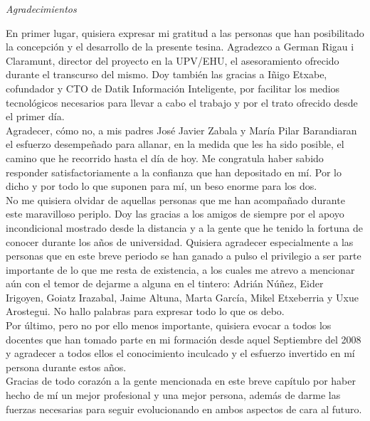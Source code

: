 \begin{flushright}
	\Large\textit{Agradecimientos}
\end{flushright}

En primer lugar, quisiera expresar mi gratitud a las personas que han posibilitado la concepción y el desarrollo de la presente tesina. Agradezco a German Rigau i Claramunt, director del proyecto en la UPV/EHU, el asesoramiento ofrecido durante el transcurso del mismo. Doy también las gracias a Iñigo Etxabe, cofundador y CTO de Datik Información Inteligente, por facilitar los medios tecnológicos necesarios para llevar a cabo el trabajo y por el trato ofrecido desde el primer día.\\

Agradecer, cómo no, a mis padres José Javier Zabala y María Pilar Barandiaran el esfuerzo desempeñado para allanar, en la medida que les ha sido posible, el camino que he recorrido hasta el día de hoy. Me congratula haber sabido responder satisfactoriamente a la confianza que han depositado en mí. Por lo dicho y por todo lo que suponen para mí, un beso enorme para los dos.\\

No me quisiera olvidar de aquellas personas que me han acompañado durante este maravilloso periplo. Doy las gracias a los amigos de siempre por el apoyo incondicional mostrado desde la distancia y a la gente que he tenido la fortuna de conocer durante los años de universidad. Quisiera agradecer especialmente a las personas que en este breve periodo se han ganado a pulso el privilegio a ser parte importante de lo que me resta de existencia, a los cuales me atrevo a mencionar aún con el temor de dejarme a alguna en el tintero: Adrián Núñez, Eider Irigoyen, Goiatz Irazabal, Jaime Altuna, Marta García, Mikel Etxeberria y Uxue Arostegui. No hallo palabras para expresar todo lo que os debo.\\

Por último, pero no por ello menos importante, quisiera evocar a todos los docentes que han tomado parte en mi formación desde aquel Septiembre del 2008 y agradecer a todos ellos el conocimiento inculcado y el esfuerzo invertido en mí persona durante estos años.\\

Gracias de todo corazón a la gente mencionada en este breve capítulo por haber hecho de mí un mejor profesional y una mejor persona, además de darme las fuerzas necesarias para seguir evolucionando en ambos aspectos de cara al futuro.\\


